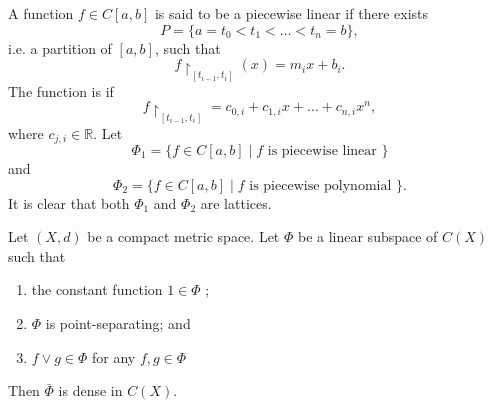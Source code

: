 \documentclass[notoc,notitlepage]{tufte-book}
\begin{document}
\begin{eg}
  A function $f \in C[a, b]$ is said to be a piecewise linear if there exists
  \begin{equation*}
    P = \{ a = t_0 < t_1 < \hdots < t_n = b \},
  \end{equation*}
  i.e. a partition of $[a, b]$, such that
  \begin{equation*}
    f \restriction_{[ t_{i - 1}, t_i ]} (x) = m_i x + b_i.
  \end{equation*}
  The function is  if
  \begin{equation*}
    f \restriction_{[t_{i - 1}, t_i]} = c_{0, i} + c_{1, i} x + \hdots + c_{n, i} x^n,
  \end{equation*}
  where $c_{j, i} \in \mathbb{R}$. Let
  \begin{equation*}
    \Phi_1 = \{ f \in C[a, b] \mid f \text{ is piecewise linear } \}
  \end{equation*}
  and
  \begin{equation*}
    \Phi_2 = \{ f \in C[a, b] \mid f \text{ is piecewise polynomial } \}.
  \end{equation*}
  It is clear that both $\Phi_1$ and $\Phi_2$ are lattices.
\end{eg}

\begin{thm}\label{thm:stone_weierstrass_theorem_lattice_version}
  Let $(X, d)$ be a compact metric space. Let $\Phi$ be a linear subspace of $C(X)$ such that
  \begin{enumerate}
    \item the constant function $1 \in \Phi$ ;
    \item $\Phi$ is point-separating; and
    \item $f \lor g \in \Phi$ for any $f, g \in \Phi$ 
  \end{enumerate}
  Then $\bar{\Phi}$ is dense in $C(X)$.
\end{thm}
\end{document}
